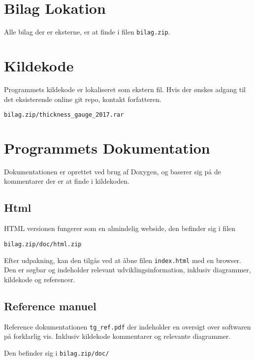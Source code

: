 \appendix
\section{Bilag Lokation}
Alle bilag der er eksterne, er at finde i filen \texttt{bilag.zip}.

\section{Kildekode}
Programmets kildekode er lokaliseret som ekstern fil.
Hvis der ønskes adgang til det eksisterende online git repo, kontakt forfatteren.

\texttt{bilag.zip/thickness\_gauge\_2017.rar}

\section{Programmets Dokumentation}

Dokumentationen er oprettet ved brug af Doxygen, og baserer sig på de kommentarer der er at finde i kildekoden.

\subsection{Html}

HTML versionen fungerer som en almindelig webside, den befinder sig i filen

\texttt{bilag.zip/doc/html.zip}

Efter udpakning, kan den tilgås ved at åbne filen \texttt{index.html} med en browser.
Den er søgbar og indeholder relevant udviklingsinformation, inklusiv diagrammer, kildekode og referencer.

\subsection{Reference manuel}

Reference dokumentationen \texttt{tg\_ref.pdf} der indeholder en oversigt over softwaren på forklarlig vis. Inklusiv kildekode kommentarer og relevante diagrammer.

Den befinder sig i \texttt{bilag.zip/doc/}
